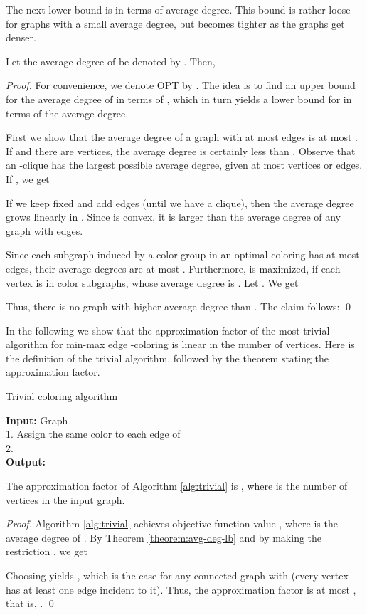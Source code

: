 \documentclass[runningheads, a4paper]{llncs}
\begin{document}
The next lower bound is in terms of average degree. This bound is rather loose for graphs with a small average degree, but becomes tighter as the graphs get denser.
\begin{theorem}\label{theorem:avg-deg-lb}
Let the average degree of  be denoted by . Then,

\end{theorem}

\begin{proof}
For convenience, we denote OPT by . The idea is to find an upper bound for the average degree of  in terms of , which in turn yields a lower bound for  in terms of the average degree.

First we show that the average degree of a graph with at most  edges is at most . If  and there are  vertices, the average degree is certainly less than . Observe that an -clique  has the largest possible average degree, given at most  vertices or  edges. If , we get

If we keep  fixed and add edges (until we have a clique), then the average degree grows linearly in . Since  is convex, it is larger than the average degree of any graph with  edges. 



Since each subgraph induced by a color group in an optimal coloring has at most  edges, their average degrees are at most . Furthermore,  is maximized, if each vertex is in  color subgraphs, whose average degree is . Let . We get

Thus, there is no graph with higher average degree than . The claim follows:
 \qed
\end{proof}



In the following we show that the approximation factor of the most trivial algorithm for min-max edge -coloring is linear in the number of vertices. Here is the definition of the trivial algorithm, followed by the theorem stating the approximation factor.

\begin{algorithm}
\caption{Trivial coloring algorithm}
\label{alg:trivial}
\textbf{Input:} Graph  \\
1. Assign the same color to each edge of  \\
2.  \\
\textbf{Output:} 
\end{algorithm}

\begin{theorem}\label{theorem:factor-ub}
The approximation factor of Algorithm \ref{alg:trivial} is , where  is the number of vertices in the input graph.
\end{theorem}
\begin{proof}
Algorithm \ref{alg:trivial} achieves objective function value , where  is the average degree of . By Theorem \ref{theorem:avg-deg-lb} and by making the restriction , we get

Choosing  yields , which is the case for any connected graph with  (every vertex has at least one edge incident to it). Thus, the approximation factor is at most , that is, . \qed
\end{proof}
\end{document}
